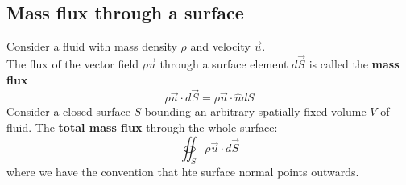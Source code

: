 \documentclass[11pt]{article}
\begin{document}
        \subsection{Mass flux through a surface}\label{subsec:mass-flux-through-a-surface}
            Consider a fluid with mass density $\rho$ and velocity $\vec{u}$.\\
            The flux of the vector field $\rho \vec{u}$ through a surface element $d\vec{S}$ is called the \textbf{mass flux}
            \begin{equation}
                \label{eq:equation2}
                \rho \vec{u} \cdot d\vec{S} = \rho \vec{u} \cdot \hat{n} dS
            \end{equation}
            Consider a closed surface $S$ bounding an arbitrary spatially \underline{fixed} volume $V$ of fluid.
            The \textbf{total mass flux} through the whole surface:
            \begin{equation}
                \label{eq:equation3}
                \oiint_{S} \rho \vec{u} \cdot d\vec{S}
            \end{equation}
            where we have the convention that hte surface normal points outwards.
\end{document}

